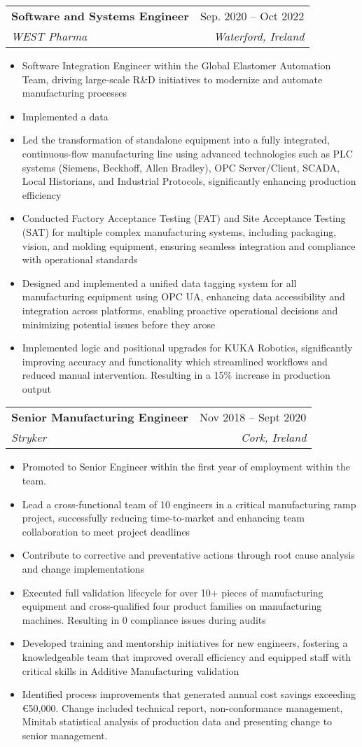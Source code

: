 \documentclass[letterpaper,11pt]{article}
\makeatletter
\newcommand{\resumeItem}[1]{
  \item\small{
    {#1 \vspace{-2pt}}
  }
}
\newcommand{\resumeSubheading}[4]{
  \vspace{-2pt}\item
    \begin{tabular*}{0.97\textwidth}[t]{l@{\extracolsep{\fill}}r}
      \textbf{#1} & #2 \\
      \textit{\small#3} & \textit{\small #4} \\
    \end{tabular*}\vspace{-7pt}
}
\newcommand{\resumeSubHeadingListEnd}{\end{itemize}}
\newcommand{\resumeItemListStart}{\begin{itemize}}
\newcommand{\resumeItemListEnd}{\end{itemize}\vspace{-5pt}}
\makeatother
\begin{document}
    \resumeSubheading
      {Software and Systems Engineer}{Sep. 2020 -- Oct 2022}
      {WEST Pharma}{Waterford, Ireland}
      \resumeItemListStart
        \resumeItem{Software Integration Engineer within the Global Elastomer Automation Team, driving large-scale R\&D initiatives to modernize and automate manufacturing processes}
        \resumeItem{Implemented a data }
        \resumeItem{Led the transformation of standalone equipment into a fully integrated, continuous-flow manufacturing line using advanced technologies such as PLC systems (Siemens, Beckhoff, Allen Bradley), OPC Server/Client, SCADA, Local Historians, and Industrial Protocols, significantly enhancing production efficiency}
        \resumeItem{Conducted Factory Acceptance Testing (FAT) and Site Acceptance Testing (SAT) for multiple complex manufacturing systems, including packaging, vision, and molding equipment, ensuring seamless integration and compliance with operational standards}
        \resumeItem{Designed and implemented a unified data tagging system for all manufacturing equipment using OPC UA, enhancing data accessibility and integration across platforms, enabling proactive operational decisions and minimizing potential issues before they arose}
        \resumeItem{Implemented logic and positional upgrades for KUKA Robotics, significantly improving accuracy and functionality which streamlined workflows and reduced manual intervention. Resulting in a 15\% increase in production output} \linebreak[4]
        
    \resumeItemListEnd
    
    \resumeSubheading
      {Senior Manufacturing Engineer}{Nov 2018 -- Sept 2020}
      {Stryker}{Cork, Ireland}
      \resumeItemListStart
      \resumeItem{Promoted to Senior Engineer within the first year of employment within the team.}
        \resumeItem{Lead a cross-functional team of 10 engineers in a critical manufacturing ramp project, successfully reducing time-to-market and enhancing team collaboration to meet project deadlines}
        \resumeItem{Contribute to corrective and preventative actions through root cause analysis and change implementations}
        \resumeItem{Executed full validation lifecycle for over 10+ pieces of manufacturing equipment and cross-qualified four product families on manufacturing machines. Resulting in 0 compliance issues during audits}
        \resumeItem{Developed training and mentorship initiatives for new engineers, fostering a knowledgeable team that improved overall efficiency and equipped staff with critical skills in Additive Manufacturing validation}
        \resumeItem{Identified process improvements that generated annual cost savings exceeding €50,000.
        Change included technical report, non-conformance management, Minitab statistical analysis of production data and presenting change to senior management.}
  \resumeSubHeadingListEnd
\end{document}
